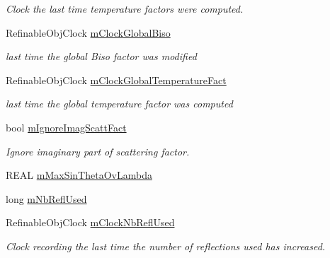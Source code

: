 \begin{DoxyCompactItemize}
\begin{DoxyCompactList}\small\item\em Clock the last time temperature factors were computed. \end{DoxyCompactList}\item 
\mbox{\label{class_obj_cryst_1_1_scattering_data_aabaceea890c524c14ca3e6c898d27f8f}} 
Refinable\+Obj\+Clock \mbox{\hyperlink{class_obj_cryst_1_1_scattering_data_aabaceea890c524c14ca3e6c898d27f8f}{m\+Clock\+Global\+Biso}}
\begin{DoxyCompactList}\small\item\em last time the global Biso factor was modified \end{DoxyCompactList}\item 
\mbox{\label{class_obj_cryst_1_1_scattering_data_a20c193cc38f93c26926dd0d362066ec0}} 
Refinable\+Obj\+Clock \mbox{\hyperlink{class_obj_cryst_1_1_scattering_data_a20c193cc38f93c26926dd0d362066ec0}{m\+Clock\+Global\+Temperature\+Fact}}
\begin{DoxyCompactList}\small\item\em last time the global temperature factor was computed \end{DoxyCompactList}\item 
bool \mbox{\hyperlink{class_obj_cryst_1_1_scattering_data_a3a9764c52916a533a44baaea89bdceab}{m\+Ignore\+Imag\+Scatt\+Fact}}
\begin{DoxyCompactList}\small\item\em Ignore imaginary part of scattering factor. \end{DoxyCompactList}\item 
R\+E\+AL \mbox{\hyperlink{class_obj_cryst_1_1_scattering_data_acb0398e21f803308b79103182906f6c5}{m\+Max\+Sin\+Theta\+Ov\+Lambda}}
\item 
long \mbox{\hyperlink{class_obj_cryst_1_1_scattering_data_a00e0972eebd70ae92231b804884a83b6}{m\+Nb\+Refl\+Used}}
\item 
\mbox{\label{class_obj_cryst_1_1_scattering_data_a03a5d099c5ff2c41dc37e4f849e5be7b}} 
Refinable\+Obj\+Clock \mbox{\hyperlink{class_obj_cryst_1_1_scattering_data_a03a5d099c5ff2c41dc37e4f849e5be7b}{m\+Clock\+Nb\+Refl\+Used}}
\begin{DoxyCompactList}\small\item\em Clock recording the last time the number of reflections used has increased. \end{DoxyCompactList}\item 

\end{DoxyCompactItemize}
